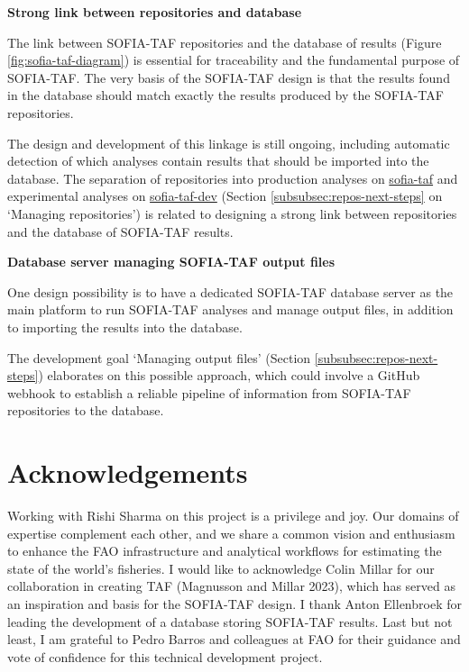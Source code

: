 \documentclass[12pt]{article}
\newcommand\blue[1]{\textcolor{darkblue}{#1}}
\begin{document}
\textbf{Strong link between repositories and database}

The link between SOFIA-TAF repositories and the database of results (Figure
\ref{fig:sofia-taf-diagram}) is essential for traceability and the fundamental
purpose of SOFIA-TAF. The very basis of the SOFIA-TAF design is that the results
found in the database should match exactly the results produced by the SOFIA-TAF
repositories.

The design and development of this linkage is still ongoing, including automatic
detection of which analyses contain results that should be imported into the
database. The separation of repositories into production analyses on
\blue{\href{https://github.com/sofia-taf}{\sf sofia-taf}} and experimental
analyses on \blue{\href{https://github.com/sofia-taf-dev}{\sf sofia-taf-dev}}
(Section \ref{subsubsec:repos-next-steps} on `Managing repositories') is related
to designing a strong link between repositories and the database of SOFIA-TAF
results.

\textbf{Database server managing SOFIA-TAF output files}

One design possibility is to have a dedicated SOFIA-TAF database server as the
main platform to run SOFIA-TAF analyses and manage output files, in addition to
importing the results into the database.

The development goal `Managing output files' (Section
\ref{subsubsec:repos-next-steps}) elaborates on this possible approach, which
could involve a GitHub webhook to establish a reliable pipeline of information
from SOFIA-TAF repositories to the database.

\vspace{3ex}


\section{Acknowledgements}

Working with Rishi Sharma on this project is a privilege and joy. Our domains of
expertise complement each other, and we share a common vision and enthusiasm to
enhance the FAO infrastructure and analytical workflows for estimating the state
of the world's fisheries. I would like to acknowledge Colin Millar for our
collaboration in creating TAF (Magnusson and Millar 2023), which has served as
an inspiration and basis for the SOFIA-TAF design. I thank Anton Ellenbroek for
leading the development of a database storing SOFIA-TAF results. Last but not
least, I am grateful to Pedro Barros and colleagues at FAO for their guidance
and vote of confidence for this technical development project.
\end{document}
